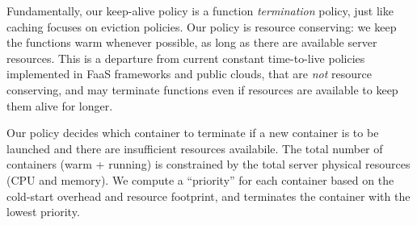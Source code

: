 Fundamentally, our keep-alive policy is a function \emph{termination} policy, just like caching focuses on eviction policies.  
Our policy is resource conserving: we keep the functions warm whenever possible, as long as there are available server resources. 
This is a departure from current constant time-to-live policies implemented in FaaS frameworks and public clouds, that are \emph{not} resource conserving, and may terminate functions even if resources are available to keep them alive for longer. 

Our policy decides which container to terminate if a new container is to be launched and there are insufficient resources availabile. 
The total number of containers (warm + running) is constrained by the total server physical resources (CPU and memory). 
We compute a ``priority'' for each container based on the cold-start overhead and resource footprint, and terminates the container with the lowest priority.
%


%
%
%
%

%






